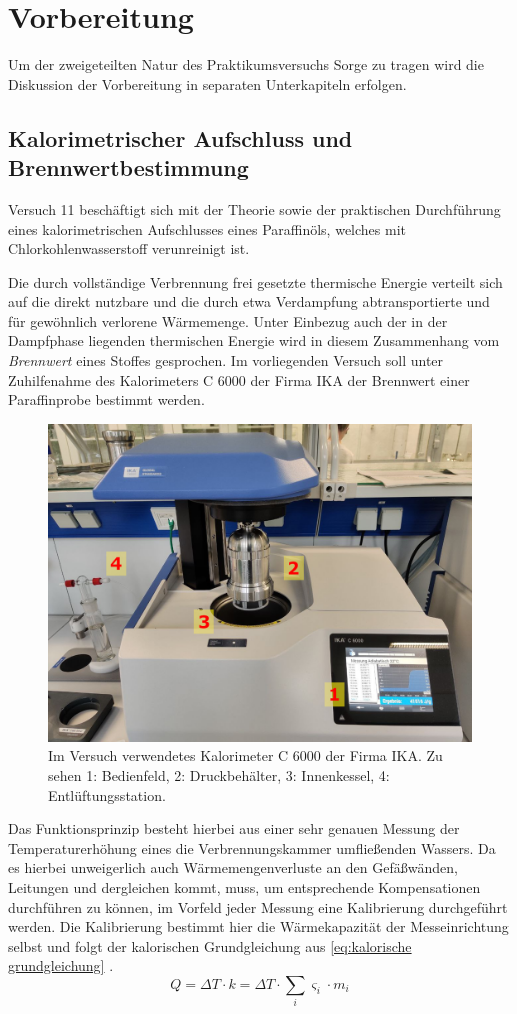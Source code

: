 \chapter{Vorbereitung}
	Um der zweigeteilten Natur des Praktikumsversuchs Sorge zu tragen wird die Diskussion der Vorbereitung in separaten Unterkapiteln
	erfolgen.
	\section{Kalorimetrischer Aufschluss und Brennwertbestimmung}\label{sec:vorbereitung kalorimetrischer aufschluss}
		Versuch 11 beschäftigt sich mit der Theorie sowie der praktischen Durchführung eines kalorimetrischen Aufschlusses
		eines Paraffinöls, welches mit Chlorkohlenwasserstoff verunreinigt ist.\par
		Die durch vollständige Verbrennung frei gesetzte thermische Energie verteilt sich auf die direkt nutzbare und die durch
		etwa Verdampfung abtransportierte und für gewöhnlich verlorene Wärmemenge. Unter Einbezug auch der in der Dampfphase liegenden
		thermischen Energie wird in diesem Zusammenhang vom \textit{Brennwert} eines Stoffes gesprochen.
		Im vorliegenden Versuch soll unter Zuhilfenahme des Kalorimeters C 6000 der Firma \textsc{IKA} der Brennwert einer Paraffinprobe
		bestimmt werden.
		\begin{figure}[h]
			\centering
			\includegraphics[width=.7\textwidth]{assets/photos/kaloriemeter_aufbau_edit.jpg}
			\caption[Im Versuch verwendetes Kalorimeter]{Im Versuch verwendetes Kalorimeter C 6000 der Firma \textsc{IKA}. Zu sehen 1: Bedienfeld, 2: Druckbehälter, 3: Innenkessel, 4: Entlüftungsstation.}
			\label{fig:kalorimeter aufbau}
		\end{figure}
		Das Funktionsprinzip besteht hierbei aus einer sehr genauen Messung der Temperaturerhöhung eines die Verbrennungskammer umfließenden
		Wassers. Da es hierbei unweigerlich auch Wärmemengenverluste an den Gefäßwänden, Leitungen und dergleichen kommt, muss,
		um entsprechende Kompensationen durchführen zu können, im Vorfeld jeder Messung eine Kalibrierung durchgeführt werden.
		Die Kalibrierung bestimmt hier die Wärmekapazität der Messeinrichtung selbst und folgt der kalorischen Grundgleichung aus \cref{eq:kalorische grundgleichung} \cite{Einstieg.in.die.Physikalische.Chemie.fuer.Nebenfaechler.Bechmann.2016}.
		\begin{equation}
			Q = \Delta T \cdot k = \Delta T \cdot \sum_i \varsigma_i \cdot m_i
			\label{eq:kalorische grundgleichung mit kaloriemeterkram}
		\end{equation}

